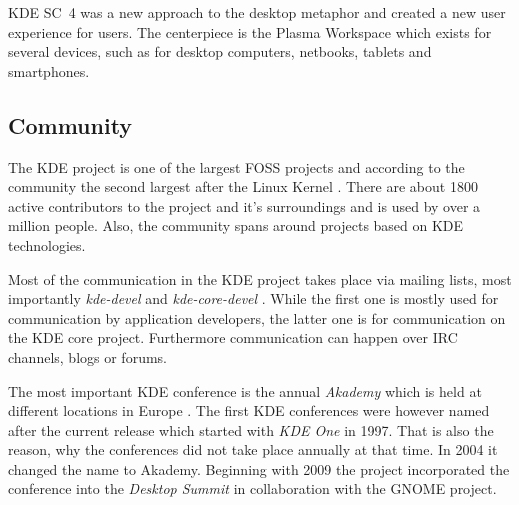 \ac{KDE SC}~4 was a new approach to the desktop metaphor and created a new user
experience for users. The centerpiece is the Plasma Workspace which exists for
several devices, such as for desktop computers, netbooks, tablets and
smartphones.


\subsection{Community} %

The KDE project is one of the largest FOSS projects and according to the
community the second largest after the Linux Kernel \cite{KDEPress}. There are
about 1800 active contributors to the project and it's surroundings and is used
by over a million people. Also, the community spans around projects based on
KDE technologies.

Most of the communication in the KDE project takes place via mailing lists,
most importantly \emph{kde-devel} and \emph{kde-core-devel}
\cite{KDEProjectManagement,KDEContribute}. While the first one is mostly used
for communication by application developers, the latter one is for
communication on the KDE core project. Furthermore communication can happen
over \ac{IRC} channels, blogs or forums.

The most important KDE conference is the annual \emph{Akademy} which is held at
different locations in Europe \cite{KDEHistory}. The first KDE conferences were
however named after the current release which started with \emph{KDE One} in
1997. That is also the reason, why the conferences did not take place annually
at that time. In 2004 it changed the name to Akademy. Beginning with 2009 the
project incorporated the conference into the \emph{Desktop Summit} in
collaboration with the GNOME project.

